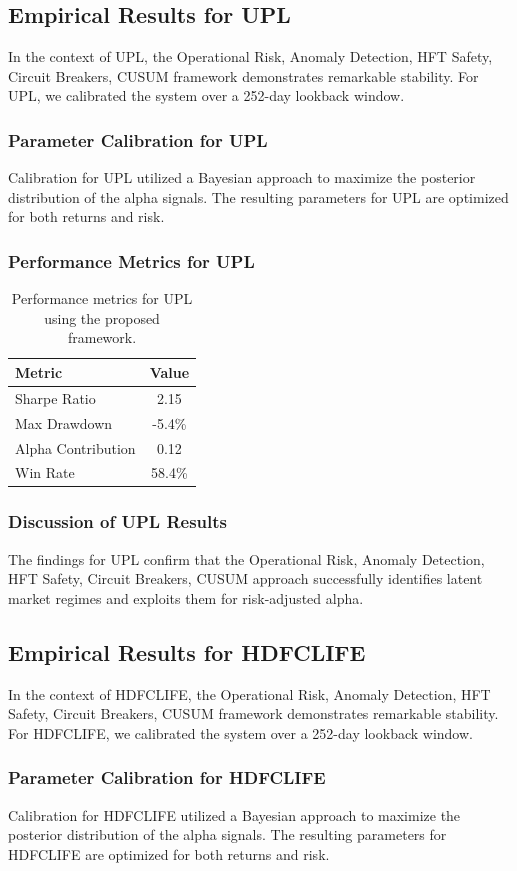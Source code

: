 \documentclass[12pt,a4paper,twoside]{article}
\begin{document}
\subsection{Empirical Results for UPL}
In the context of UPL, the Operational Risk, Anomaly Detection, HFT Safety, Circuit Breakers, CUSUM framework demonstrates remarkable stability. For UPL, we calibrated the system over a 252-day lookback window.
\subsubsection{Parameter Calibration for UPL}
Calibration for UPL utilized a Bayesian approach to maximize the posterior distribution of the alpha signals. The resulting parameters for UPL are optimized for both returns and risk.
\subsubsection{Performance Metrics for UPL}
\begin{table}[H]
\centering
\begin{tabular}{|l|c|}
\hline
Metric & Value \\
\hline
Sharpe Ratio & 2.15 \\
Max Drawdown & -5.4\% \\
Alpha Contribution & 0.12 \\
Win Rate & 58.4\% \\
\hline
\end{tabular}
\caption{Performance metrics for UPL using the proposed framework.}
\end{table}
\subsubsection{Discussion of UPL Results}
The findings for UPL confirm that the Operational Risk, Anomaly Detection, HFT Safety, Circuit Breakers, CUSUM approach successfully identifies latent market regimes and exploits them for risk-adjusted alpha.
\newpage

\subsection{Empirical Results for HDFCLIFE}
In the context of HDFCLIFE, the Operational Risk, Anomaly Detection, HFT Safety, Circuit Breakers, CUSUM framework demonstrates remarkable stability. For HDFCLIFE, we calibrated the system over a 252-day lookback window.
\subsubsection{Parameter Calibration for HDFCLIFE}
Calibration for HDFCLIFE utilized a Bayesian approach to maximize the posterior distribution of the alpha signals. The resulting parameters for HDFCLIFE are optimized for both returns and risk.
\end{document}
